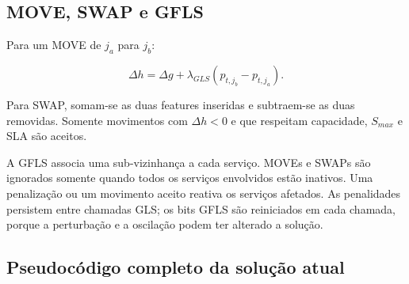 \documentclass{article}
\begin{document}
\subsection{MOVE, SWAP e GFLS}

Para um MOVE de $j_a$ para $j_b$:

\begin{equation}
    \Delta h=\Delta g+\lambda_{GLS}(p_{t,j_b}-p_{t,j_a}).
\end{equation}

Para SWAP, somam-se as duas features inseridas e subtraem-se as duas removidas.
Somente movimentos com $\Delta h<0$ e que respeitam capacidade, $S_{max}$ e SLA
são aceitos.

A GFLS associa uma sub-vizinhança a cada serviço. MOVEs e SWAPs são ignorados
somente quando todos os serviços envolvidos estão inativos. Uma penalização ou
um movimento aceito reativa os serviços afetados. As penalidades persistem
entre chamadas GLS; os bits GFLS são reiniciados em cada chamada, porque a
perturbação e a oscilação podem ter alterado a solução.

\subsection{Pseudocódigo completo da solução atual}
\end{document}
